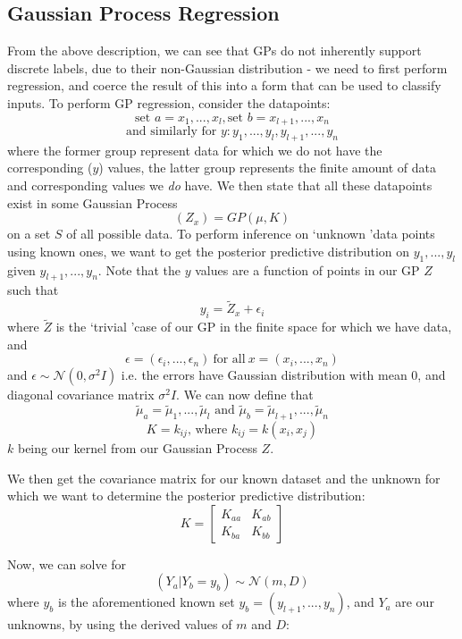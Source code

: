 \documentclass[10pt,sts]{article}
\begin{document}
\begin{multicols}{2}
    \subsection{Gaussian Process Regression} From the above description, we can see that GPs do not inherently support discrete labels, due to their non-Gaussian distribution - we need to first perform regression, and coerce the result of this into a form that can be used to classify inputs. To perform GP regression, consider the datapoints:
    $$ \textrm{set } a = x_1, ... , x_l, \textrm{set } b = x_{l+1}, ... , x_n $$
    $$ \textrm{and similarly for } y: y_1, ... , y_l, y_{l+1}, ... , y_n $$
    where the former group represent data for which we do not have the corresponding ($y$) values, the latter group represents the finite amount of data and corresponding values we \textit{do} have. We then state that all these datapoints exist in some Gaussian Process $$ (Z_x) = GP(\mu, K) $$ on a set $S$ of all possible data. To perform inference on \lq unknown \rq data points using known ones, we want to get the posterior predictive distribution on $y_1, ... , y_l$ given $y_{l+1}, ... , y_n$. Note that the $y$ values are a function of points in our GP $Z$ such that $$y_i = \widetilde{Z}_x + \epsilon_i$$ where $\widetilde{Z}$ is the \lq trivial \rq case of our GP in the finite space for which we have data, and $$\epsilon = (\epsilon_i, ... , \epsilon_n) \ \textrm{for all} \ x = (x_i, ... , x_n)$$ and $\epsilon \sim \mathcal{N}(0, \sigma^2I)$ i.e. the errors have Gaussian distribution with mean 0, and diagonal covariance matrix $\sigma^2I$. We can now define that $$\widetilde{\mu}_{a} = \widetilde{\mu}_{1} ,..., \widetilde{\mu}_{l} \textrm{ and } \widetilde{\mu}_{b} = \widetilde{\mu}_{l+1} ,..., \widetilde{\mu}_{n}$$ 
    $$ K = k_{ij} \textrm{, where } k_{ij} = k(x_i, x_j) $$
    $k$ being our kernel from our Gaussian Process $Z$. 

    We then get the covariance matrix for our known dataset and the unknown for which we want to determine the posterior predictive distribution:
    $$ K = 
    \begin{bmatrix}
        K_{aa} & K_{ab} \\
        K_{ba} & K_{bb} 
    \end{bmatrix}
    $$

    Now, we can solve for $$(Y_a | Y_b = y_b) \sim \mathcal{N}(m, D)$$
    where $y_b$ is the aforementioned known set $y_b = (y_{l+1}, ... , y_{n})$, and $Y_a$ are our unknowns, by using the derived values of $m$ and $D$:


\end{multicols}
\end{document}
